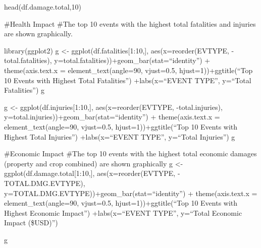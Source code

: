 \documentclass[
]{article}
\begin{document}
head(df.damage.total,10)

\#Health Impact \#The top 10 events with the highest total fatalities
and injuries are shown graphically.

library(ggplot2) g \textless- ggplot(df.fatalities{[}1:10,{]},
aes(x=reorder(EVTYPE, -total.fatalities),
y=total.fatalities))+geom\_bar(stat=``identity'') + theme(axis.text.x =
element\_text(angle=90, vjust=0.5, hjust=1))+ggtitle(``Top 10 Events
with Highest Total Fatalities'') +labs(x=``EVENT TYPE'', y=``Total
Fatalities'') g

g \textless- ggplot(df.injuries{[}1:10,{]}, aes(x=reorder(EVTYPE,
-total.injuries), y=total.injuries))+geom\_bar(stat=``identity'') +
theme(axis.text.x = element\_text(angle=90, vjust=0.5,
hjust=1))+ggtitle(``Top 10 Events with Highest Total Injuries'')
+labs(x=``EVENT TYPE'', y=``Total Injuries'') g

\#Economic Impact \#The top 10 events with the highest total economic
damages (property and crop combined) are shown graphically g \textless-
ggplot(df.damage.total{[}1:10,{]}, aes(x=reorder(EVTYPE,
-TOTAL.DMG.EVTYPE), y=TOTAL.DMG.EVTYPE))+geom\_bar(stat=``identity'') +
theme(axis.text.x = element\_text(angle=90, vjust=0.5,
hjust=1))+ggtitle(``Top 10 Events with Highest Economic Impact'')
+labs(x=``EVENT TYPE'', y=``Total Economic Impact (\$USD)'')

g
\end{document}
